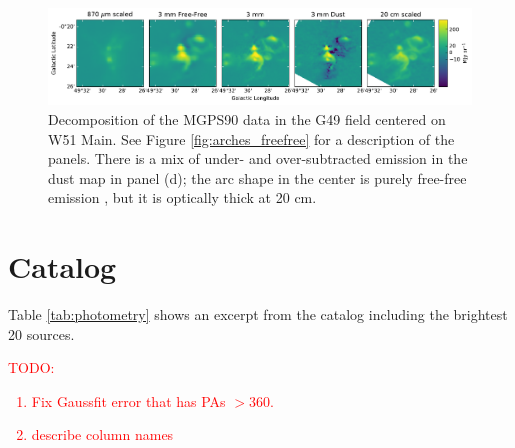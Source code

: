 \documentclass[twocolumn]{aastex62}
\def\todo#1{{\textcolor{red}{TODO: #1}}}
\begin{document}
\begin{figure}[htp]
    \includegraphics[width=17cm]{figures/G49_w51main_5panel.pdf}
    \caption{Decomposition of the MGPS90 data in the G49 field centered on W51 Main.
    See Figure \ref{fig:arches_freefree} for a description of the panels.
    There is a mix of under- and over-subtracted emission in the dust map in panel (d);
    the arc shape in the center is purely free-free emission \citep{Ginsburg2016a,Ginsburg2017a}, but
    it is optically thick at 20 cm.
}
\label{fig:w51mainfreefree}
\end{figure}

\section{Catalog}
\label{appendix:Catalog}
Table \ref{tab:photometry} shows an excerpt from the catalog including
the brightest 20 sources.

\todo{\begin{enumerate}
    \item Fix Gaussfit error that has PAs $>360$.
    \item describe column names
\end{enumerate}
}






\end{document}
